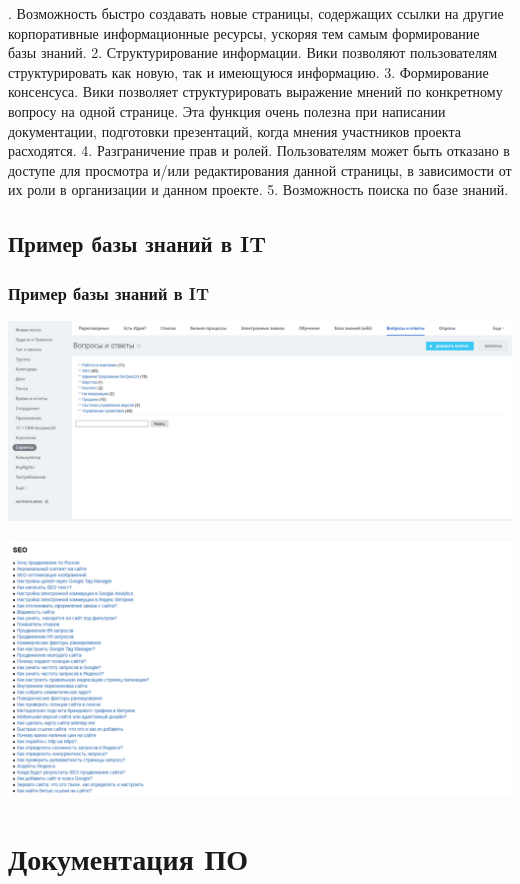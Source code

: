 \documentclass{../industrial-development}
\begin{document}
. Возможность быстро создавать новые страницы, содержащих ссылки на другие корпоративные информационные ресурсы, ускоряя тем самым формирование базы знаний.
2. Структурирование информации. Вики позволяют пользователям структурировать как новую, так и имеющуюся информацию.
3. Формирование консенсуса. Вики позволяет структурировать выражение мнений по конкретному вопросу на одной странице. Эта функция очень полезна при написании документации, подготовки презентаций, когда мнения участников проекта расходятся.
4. Разграничение прав и ролей. Пользователям может быть отказано в доступе для просмотра и/или редактирования данной страницы, в зависимости от их роли в организации и данном проекте.
5. Возможность поиска по базе знаний.

\subsection{Пример базы знаний в IT}
\begin{frame} \frametitle{Пример базы знаний в IT}
\centerline{\includegraphics[width=1\textwidth]{voprosy-otvety.pdf}}
\centerline{\includegraphics[width=1\textwidth]{seo.pdf}}
\end{frame}

\section{Документация ПО}
\end{document}
